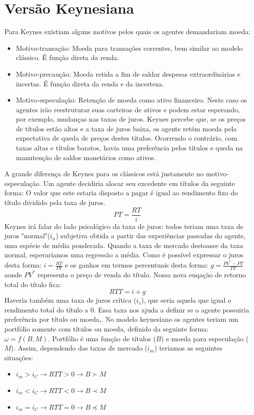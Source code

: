 \documentclass[12pt,a4paper,oneside,brazil]{abntex2}
\begin{document}
\section{Versão Keynesiana}
Para Keynes existiam alguns motivos pelos quais os agentes demandariam moeda:
\begin{itemize}
\item Motivo-transação: Moeda para transações correntes, bem similar ao modelo clássico. É função direta da renda.
\item Motivo-precaução: Moeda retida a fim de saldar despesas extraordinárias e incertas. É função direta da renda e da incerteza.
\item Motivo-especulação: Retenção de moeda como ativo financeiro. Neste caso os agentes irão reestruturar suas carteiras de ativos e podem estar esperando, por exemplo, mudanças nas taxas de juros. Keynes percebe que, se os preços de títulos estão altos e a taxa de juros baixa, os agente retém moeda pela expectativa de queda de preços destes títulos. Ocorrendo o contrário, com taxas altas e títulos baratos, havia uma preferência pelos títulos e queda na manutenção de saldos monetários como ativos.
\end{itemize}
A grande diferença de Keynes para os clássicos está justamente no motivo-especulação. Um agente decidiria alocar seu excedente em títulos da seguinte forma: O valor que este estaria disposto a pagar é igual ao rendimento fixo do título dividido pela taxa de juros.
\[ PT = \frac{RT}{i}\]
Keynes irá falar do lado psicológico da taxa de juros: todos teriam uma taxa de juros "normal"($ i_n$) subjetiva obtida a partir das experiências passadas do agente, uma espécie de média ponderada. Quando a taxa de mercado destoasse da taxa normal, esperaríamos uma regressão a média.
Como é possível expressar o juros desta forma: $i = \frac{RT}{PT}$ e os ganhos em termos percentuais desta forma: $ g = \frac{PV^* - PT}{PT}$ aonde $PV^*$ representa o preço de venda do título. Nossa nova euqação de retorno total do título fica:
\[ RTT = i + g\]
Haveria também uma taxa de juros crítica ($i_c$), que seria aquela que igual o rendimento total do título a 0. Essa taxa nos ajuda a definir se o agente possuiria preferência por título ou moeda,. No modelo keynesiano os agentes teriam um portfólio somente com títulos ou moeda, definido da seguinte forma: $ \omega =  f(B,M)$. Portfólio é uma função de títulos ($B$) e moeda para especulação ($M$).
Assim, dependendo das taxas de mercado ($i_m$) teriamos as seguintes situações:
\begin{itemize}
\item $i_m > i_C \rightarrow RTT > 0 \rightarrow B \succ M$
\item $i_m < i_C \rightarrow RTT < 0 \rightarrow B \prec M$
\item $i_m = i_C \rightarrow RTT = 0 \rightarrow B \preceq M$
\end{itemize}
\end{document}
